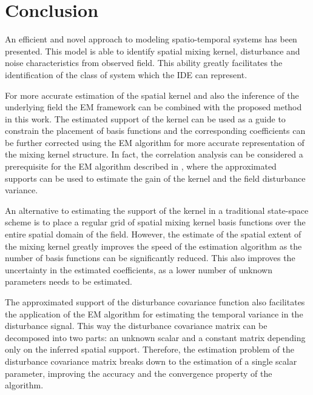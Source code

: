 \documentclass[10pt,twocolumn,twoside]{IEEEtran}
\begin{document}
{%
\section{Conclusion}
An efficient and novel approach to modeling spatio-temporal systems has been presented. This model is able to identify spatial mixing kernel, disturbance and noise characteristics from observed field. This ability greatly facilitates the identification of the class of system which the IDE can represent.


For more accurate estimation of the spatial kernel and also the inference of the underlying field the EM framework can be combined with the proposed method in this work. The estimated support of the kernel can be  used as a guide to constrain the placement of basis functions and the corresponding coefficients can be further corrected using the EM algorithm for more accurate representation of the mixing kernel structure. In fact, the correlation analysis can be considered a prerequisite for the EM algorithm described in \cite{Dewar2009}, where the approximated supports can be used to estimate the gain of the kernel and the field disturbance variance.                                             
                                                                                                                                                                              

An alternative to estimating the support of the kernel in a traditional state-space scheme is to place a regular grid of spatial mixing kernel basis functions over the entire spatial domain of the field. However, the estimate of the spatial extent of the mixing kernel greatly improves the speed of the estimation algorithm as the number of basis functions can be significantly reduced. This also improves the uncertainty in the estimated coefficients, as a lower number of unknown parameters needs to be estimated. 

The approximated support of the disturbance covariance function also facilitates the application of the EM algorithm for estimating the temporal variance in the disturbance signal. This way the disturbance covariance matrix can be decomposed into two parts: an unknown scalar and a constant matrix depending only on the inferred spatial support. Therefore, the estimation problem of the disturbance covariance matrix breaks down to the estimation of a single scalar parameter, improving the accuracy and the convergence property of the algorithm.

}
\end{document}

